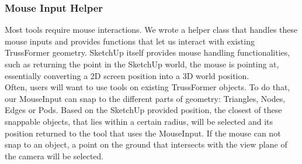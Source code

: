 \subsubsection{Mouse Input Helper}
Most tools require mouse interactions. We wrote a helper class that handles these mouse inputs and provides functions that let us interact with existing TrussFormer geometry. SketchUp itself provides mouse handling functionalities, such as returning the point in the SketchUp world, the mouse is pointing at, essentially converting a 2D screen position into a 3D world position.\\
Often, users will want to use tools on existing TrussFormer objects. To do that, our MouseInput can snap to the different parts of geometry: Triangles, Nodes, Edges or Pods. Based on the SketchUp provided position, the closest of these snappable objects, that lies within a certain radius, will be selected and its position returned to the tool that uses the MouseInput. If the mouse can not snap to an object, a point on the ground that intersects with the view plane of the camera will be selected.

